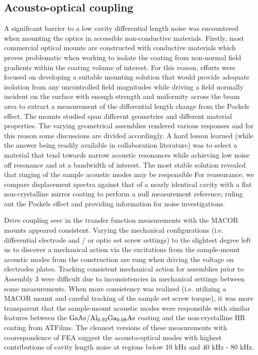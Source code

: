 \subsection{Acousto-optical coupling}
A significant barrier to a low cavity differential length noise was encountered when mounting the optics in accessible non-conductive materials. Firstly, most commercial optical mounts are constructed with conductive materials which proves problematic when working to isolate the coating from non-normal field gradients within the coating volume of interest. For this reason, efforts were focused on developing a suitable mounting solution that would provide adequate isolation from any uncontrolled field magnitudes while driving a field normally incident on the surface with enough strength and uniformity across the beam area to extract a measurement of the differential length change from the Pockels effect. The mounts studied span different geometries and different material properties. The varying geometrical assemblies rendered various responses and for this reason some discussions are divided accordingly. A hard lesson learned (while the answer being readily available in collaboration literature) was to select a material that tend towards narrow acoustic resonances while achieving low noise off resonance and at a bandwidth of interest. The most stable solution revealed that ringing of the sample acoustic modes may be responsible For reassurance, we compare displacement spectra against that of a nearly identical cavity with a flat non-crystalline mirror coating to perform a null measurement reference; ruling out the Pockels effect and providing information for noise investigations.


Drive coupling seec in the transfer function measurements with the MACOR mounts appeared consistent. Varying the mechanical configurations (i.e. differential electrode and / or optic set screw settings) to the slightest degree left us to discover a mechanical action via the excitations from the sample-mount acoustic modes from the construction are rung when driving the voltage on electrodes plates. Tracking consistent mechanical action for assemblies prior to Assembly 3 were difficult due to inconsistencies in mechanical settings between some measurements. When more consistency was realized (i.e. utilizing a MACOR mount and careful tracking of the sample set screw torque), it was more transparent that the sample-mount acoustic modes were responsible with similar features between the $\mathrm{GaAs}$/$\mathrm{Al_{0.92}Ga_{0.08}As}$ coating and the non-crystalline HR coating from ATFilms. The cleanest versions of these measurements with coorespondence of FEA suggest the acousto-optical modes with highest contributions of cavity length noise at regions below 10 kHz and 40 kHz - 80 kHz. 



